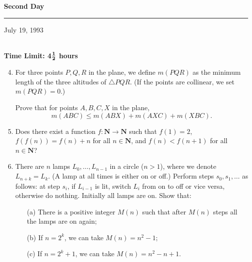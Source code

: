 \documentclass[12pt]{article}
\begin{document}
\begin{center}
{\bf Second Day \rule[.05in]{.25in}{.01in} July 19, 1993} \\
{\bf Time Limit: 4}${{\bf 1}\over{\bf 2}}$ {\bf
hours}
\end{center}
\begin{enumerate}
\setcounter{enumi}{3}
\item
For three points $P,Q,R$ in the plane, we define $m(PQR)$ as the minimum 
length of the three altitudes of $\triangle PQR$. (If the points are 
collinear, we set $m(PQR) = 0$.)

Prove that for points $A,B,C,X$ in the plane,
\[
m(ABC) \leq m(ABX) + m(AXC) + m(XBC).
\]  
\item
Does there exist a function $f: \mathbf{N} \to \mathbf{N}$ such that 
$f(1) = 2$, $f(f(n)) = f(n) + n$ for all $n \in \mathbf{N}$, and $f(n) < 
f(n+1)$ for all $n \in \mathbf{N}$?
\item
There are $n$ lamps $L_0, \dots, L_{n-1}$ in a circle ($n>1$), where we 
denote $L_{n+k} = L_k$. (A lamp at all times is either on or off.) 
Perform steps $s_0, s_1, \dots$ as follows: at step $s_i$, if $L_{i-1}$ 
is lit, switch $L_i$ from on to off or vice versa, otherwise do nothing. 
Initially all lamps are on. Show that:
\begin{itemize}
	\item[(a)] There is a positive integer $M(n)$ such that after $M(n)$ 
	steps all the lamps are on again;

	\item[(b)] If $n = 2^k$, we can take $M(n) = n^2 - 1$;

	\item[(c)] If $n = 2^k + 1$, we can take $M(n) = n^2 - n + 1$.
\end{itemize}
\end{enumerate}
\end{document}
